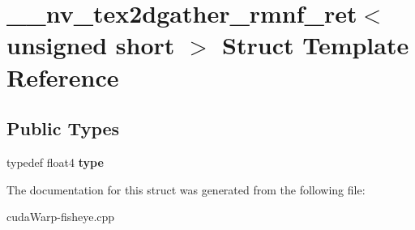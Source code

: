 \hypertarget{struct____nv__tex2dgather__rmnf__ret_3_01unsigned_01short_01_4}{}\section{\+\_\+\+\_\+nv\+\_\+tex2dgather\+\_\+rmnf\+\_\+ret$<$ unsigned short $>$ Struct Template Reference}
\label{struct____nv__tex2dgather__rmnf__ret_3_01unsigned_01short_01_4}
\subsection*{Public Types}
\begin{DoxyCompactItemize}
\item 
typedef float4 {\bfseries type}\hypertarget{struct____nv__tex2dgather__rmnf__ret_3_01unsigned_01short_01_4_aa1500333c8bf53b0b51d83c96213faf9}{}\label{struct____nv__tex2dgather__rmnf__ret_3_01unsigned_01short_01_4_aa1500333c8bf53b0b51d83c96213faf9}

\end{DoxyCompactItemize}


The documentation for this struct was generated from the following file\+:\begin{DoxyCompactItemize}
\item 
cuda\+Warp-\/fisheye.\+cpp\end{DoxyCompactItemize}
